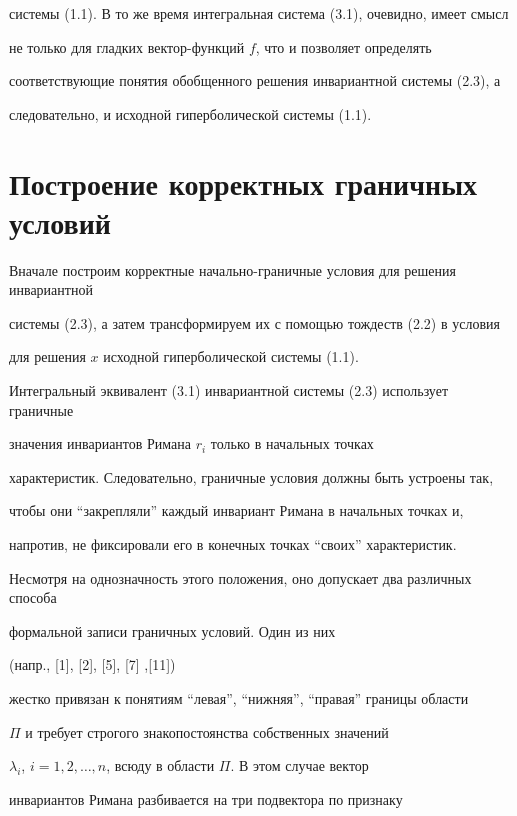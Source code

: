 системы (1.1). В то же время интегральная система (3.1), очевидно, имеет смысл


не только для гладких вектор-функций $f$, что и позволяет определять 


соответствующие понятия обобщенного решения инвариантной системы (2.3), а 


следовательно, и исходной гиперболической системы (1.1).








\section{Построение корректных граничных условий}





Вначале построим корректные начально-граничные условия для решения инвариантной 


системы (2.3), а затем трансформируем их с помощью тождеств (2.2) в условия 


для решения $x$ исходной гиперболической системы (1.1).





Интегральный эквивалент (3.1) инвариантной системы (2.3) использует граничные 


значения инвариантов Римана $r_i$ только в начальных точках 


характеристик. Следовательно, граничные условия должны быть устроены так, 


чтобы они ``закрепляли'' каждый инвариант Римана в начальных точках и,


напротив, не фиксировали его в конечных точках  ``своих''  характеристик. 


Несмотря на однозначность этого положения, оно допускает два различных способа


формальной записи граничных условий. Один из них


(напр., [1], [2], [5], [7] ,[11]) 


жестко привязан к понятиям  ``левая'', ``нижняя'', ``правая''  границы области 


$\Pi$ и требует строгого знакопостоянства собственных значений 


$\lambda_i$, $i=1,2,\dotsc,n$, всюду в области $\Pi$. В этом случае вектор 


инвариантов Римана разбивается на три подвектора по признаку 



